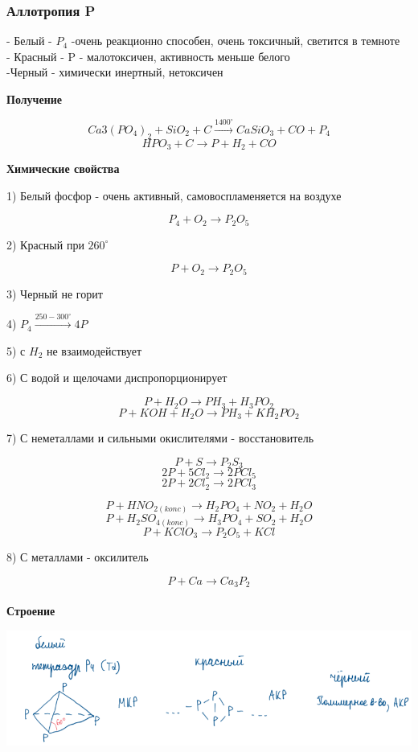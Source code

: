 \documentclass[14pt,a4paper]{scrartcl}
\begin{document}
\subsubsection{Аллотропия P}

- Белый - $P_4$ -очень реакционно способен, очень токсичный, светится в темноте\\
- Красный - P - малотоксичен, активность меньше белого\\
-Черный - химически инертный, нетоксичен

\textbf{Получение}

$$Ca3(PO_4)_2 + SiO_2 + C \xrightarrow{1400^{\circ}} CaSiO_3 + CO + P_4$$
$$HPO_3 + C \rightarrow P + H_2 + CO$$

\textbf{Химические свойства}

1) Белый фосфор - очень активный, самовоспламеняется на воздухе

$$P_4 + O_2 \rightarrow P_2O_5$$

2) Красный при $260^{\circ}$

$$P + O_2 \rightarrow P_2O_5$$

3) Черный не горит

4) $P_4 \xrightarrow{250-300^{\circ}} 4P$

5) с $H_2$ не взаимодействует

6) С водой и щелочами диспропорционирует

$$P + H_2O \rightarrow PH_3 + H_3PO_2$$
$$P + KOH + H_2O \rightarrow PH_3 + KH_2PO_2$$

7) С неметаллами и сильными окислителями - восстановитель

$$P + S \rightarrow P_2S_3$$
$$2P + 5Cl_2 \rightarrow 2PCl_5$$
$$2P + 2Cl_2 \rightarrow 2PCl_3$$

$$P + HNO_{2(konc)} \rightarrow H_2PO_4 + NO_2 + H_2O$$
$$P + H_2SO_{4(konc)} \rightarrow H_3PO_4 + SO_2 + H_2O$$
$$P + KClO_3 \rightarrow P_2O_5 + KCl$$

8) С металлами - оксилитель

$$P + Ca \rightarrow Ca_3P_2$$
\\

\textbf{Строение}

\includegraphics{9v1.png}
\end{document}
